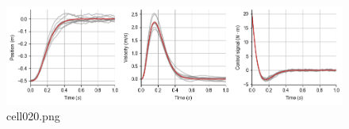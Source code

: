 \begin{figure}[ht]
	\centering
	\includegraphics[scale=0.8, max width=\linewidth]{./fig/motor-learning/infinite-horizon-ofc/cell020.png}
	\caption{cell020.png}
	\label{cell020.png}
\end{figure}